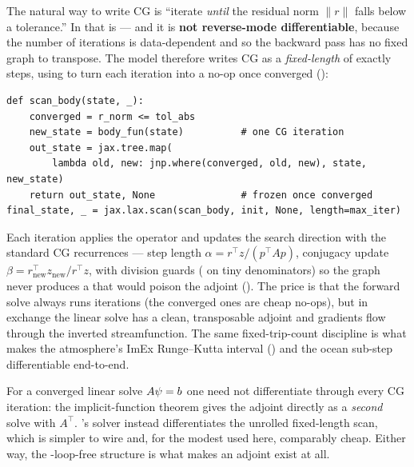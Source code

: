 The natural way to write CG is ``iterate \emph{until} the residual norm $\lVert r\rVert$ falls
below a tolerance.'' In \jax{} that is  --- and it is \textbf{not reverse-mode
differentiable}, because the number of iterations is data-dependent and so the backward pass has no
fixed graph to transpose. The model therefore writes CG as a \emph{fixed-length}  of
exactly  steps, using  to turn each iteration into a no-op once
converged ():
\begin{lstlisting}[caption={The AD-safe convergence freeze: a fixed-length scan that stops updating.}]
def scan_body(state, _):
    converged = r_norm <= tol_abs
    new_state = body_fun(state)          # one CG iteration
    out_state = jax.tree.map(
        lambda old, new: jnp.where(converged, old, new), state, new_state)
    return out_state, None               # frozen once converged
final_state, _ = jax.lax.scan(scan_body, init, None, length=max_iter)
\end{lstlisting}
Each iteration applies the operator and updates the search direction with the standard CG
recurrences --- step length $\alpha=r^{\!\top}z/(p^{\!\top}Ap)$, conjugacy update
$\beta=r_{\mathrm{new}}^{\!\top}z_{\mathrm{new}}/r^{\!\top}z$, with division guards
( on tiny denominators) so the graph never produces a  that would
poison the adjoint (). The price is that the
forward solve always runs  iterations (the converged ones are cheap no-ops), but in
exchange the linear solve has a clean, transposable adjoint and gradients flow through the inverted
streamfunction. The same fixed-trip-count discipline is what makes the atmosphere's ImEx
Runge--Kutta interval () and the ocean sub-step 
differentiable end-to-end.

\begin{remark}
For a converged linear solve $A\psi=b$ one need not differentiate through every CG iteration: the
implicit-function theorem gives the adjoint directly as a \emph{second} solve with $A^{\!\top}$.
\model{}'s solver instead differentiates the unrolled fixed-length scan, which is simpler to wire
and, for the modest  used here, comparably cheap. Either way, the
-loop-free structure is what makes an adjoint exist at all.
\end{remark}

